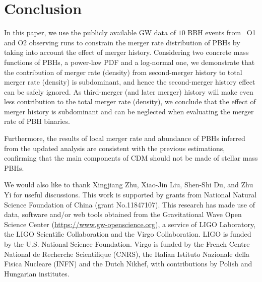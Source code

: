 \documentclass[
reprint,           %
superscriptaddress,%
amsmath,           %
amssymb,           %
aps,               %
prd,               %
notitlepage,       %
longbibliography,  %
floatfix,          %
showkeys,          %
]{revtex4-1}
\begin{document}
\section{\label{conclusion}Conclusion}

In this paper, we use the publicly available GW data of $10$ BBH events from 
\lvc\ O1 and O2 observing runs to constrain the merger rate distribution 
of PBHs by taking into account the effect of merger history.
Considering two concrete mass functions of PBHs, a power-law PDF and 
a log-normal one, we demonstrate that the contribution of merger rate (density)
from second-merger history to total merger rate (density) is 
subdominant, and hence the second-merger history effect can be safely ignored.
As third-merger (and later merger) history will make even less contribution to 
the total merger rate (density), we conclude that the effect of merger history
is subdominant and can be neglected when evaluating the merger rate of PBH
binaries.

Furthermore, the results of local merger rate and abundance of PBHs inferred from the updated
analysis are consistent with the previous estimations, 
confirming that the main components of CDM should not be made of stellar 
mass PBHs. 

\begin{acknowledgments}
We would also like to thank Xingjiang Zhu, Xiao-Jin Liu, Shen-Shi Du, and Zhu Yi for useful discussions.
This work is supported by grants from National Natural Science Foundation of China (grant No.11847107). 
This research has made use of data, software and/or web tools obtained 
from the Gravitational Wave Open Science Center \cite{Vallisneri:2014vxa}
(\url{https://www.gw-openscience.org}), a service of LIGO Laboratory, 
the LIGO Scientific Collaboration and the Virgo Collaboration. 
LIGO is funded by the U.S. National Science Foundation. 
Virgo is funded by the French Centre National de Recherche Scientifique (CNRS),
the Italian Istituto Nazionale della Fisica Nucleare (INFN) and the Dutch Nikhef,
with contributions by Polish and Hungarian institutes. 
\end{acknowledgments}	
	

\end{document}
